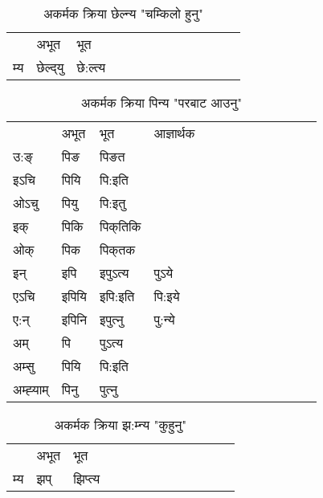 \begin{table}[H]
\label{elt.vt} \centering
\caption{अकर्मक क्रिया  छेल्न्य  "चम्किलो हुनु"  }
\begin{tabular}{l|l|l|l|l|l|l|l|l|l|l|l|l}  \toprule
&अभूत & भूत   \\ 
म्य & छेल्द्‌यु  & छे:ल्त्य  \\ 
\bottomrule
\end{tabular}
\end{table}


\begin{table}[H]
\label{i.vi} \centering
\caption{अकर्मक क्रिया  पिन्य  "परबाट आउनु"  }
\begin{tabular}{l|l|l|l|l|l|l|l|l|l|l|l|l}  \toprule
&अभूत & भूत & आज्ञार्थक \\ 
उ:ङ्‌ &पिङ &पिङत \\ 
इऽचि &पियि &पि:इति   \\ 
ओऽचु &पियु &पि:इतु   \\ 
इक् &पिकि &पिक्‌तिकि   \\ 
ओक् &पिक &पिक्‌तक   \\ 
इन् & इपि & इपुऽत्य &पुऽये  \\ 
एऽचि & इपियि & इपि:इति &पि:इये    \\ 
ए:न् & इपिनि  & इपुत्‍नु &पु:न्ये  \\ 
अम् & पि & पुऽत्य   \\ 
अम्सु & पियि & पि:इति     \\ 
अम्ह्‍याम् & पिनु  & पुत्‍नु \\ 
\bottomrule
\end{tabular}
\end{table}


\begin{table}[H]
\label{ip.vi} \centering
\caption{अकर्मक क्रिया  झ:म्‍न्य  "कुहुनु"  }
\begin{tabular}{l|l|l|l|l|l|l|l|l|l|l|l|l}  \toprule
&अभूत & भूत   \\ 
म्य & झप् & झिप्‍त्य   \\ 
\bottomrule
\end{tabular}
\end{table}


